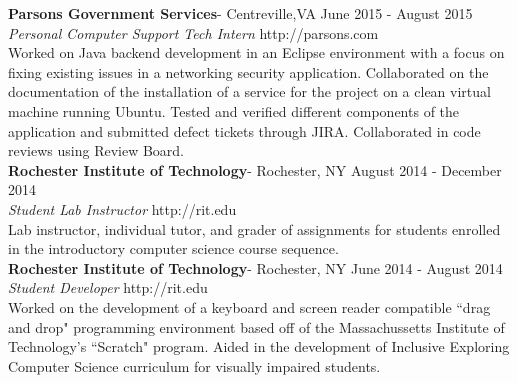 \documentclass[9pt]{extbook} %
\begin{document}
\begin{addmargin}[2cm]{0cm}
	\textbf{Parsons Government Services}- Centreville,VA			\hfill June 2015 - August 2015 \\
	\textit{Personal Computer Support Tech Intern}	\hfill http://parsons.com \\

	Worked on Java backend development in an Eclipse environment with a focus on fixing existing issues in a networking security application.  Collaborated on the documentation of the installation of a service for the project on a clean virtual machine running Ubuntu.  Tested and verified different components of the application and submitted defect tickets through JIRA.  Collaborated in code reviews using Review Board.\\
	

	\textbf{Rochester Institute of Technology}- Rochester, NY 		\hfill August 2014 - December 2014 \\
	\textit{Student Lab Instructor}								\hfill http://rit.edu \\

	\indent Lab instructor, individual tutor, and grader of assignments for students enrolled in the introductory computer science course sequence.\\


	\textbf{Rochester Institute of Technology}- Rochester, NY 	\hfill June 2014 - August 2014 \\
	\textit{Student Developer}									\hfill http://rit.edu \\

	Worked on the development of a keyboard and screen reader compatible ``drag and drop" programming environment based off of the Massachussetts Institute of Technology's ``Scratch" program.  Aided in the development of Inclusive Exploring Computer Science curriculum for visually impaired students.
\end{addmargin}

\bigskip

\end{document}
